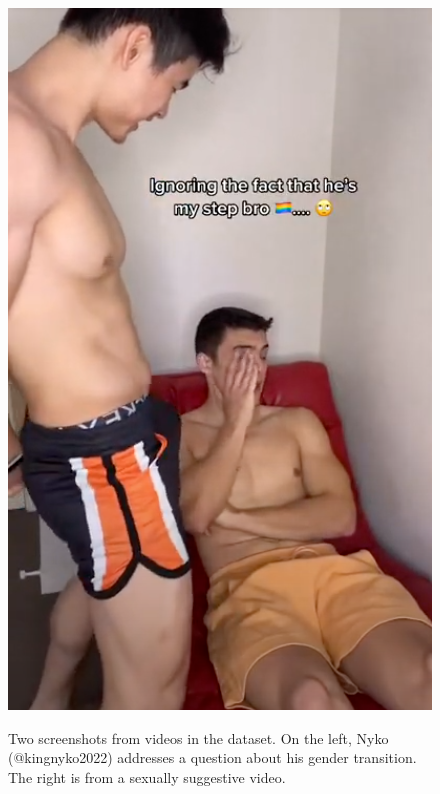 \documentclass[11pt]{article}
\begin{document}
\begin{figure}[t]
\begin{minipage}{.21\textwidth}
  \includegraphics[width=0.9\linewidth]{images/suggestive.png}
  \label{fig:test2}
\end{minipage}
\caption{Two screenshots from videos in the dataset. On the left, Nyko (@kingnyko2022) addresses a question about his gender transition. The right is from a sexually suggestive video. }
\label{fig:screenshots}
\end{figure}
\end{document}
